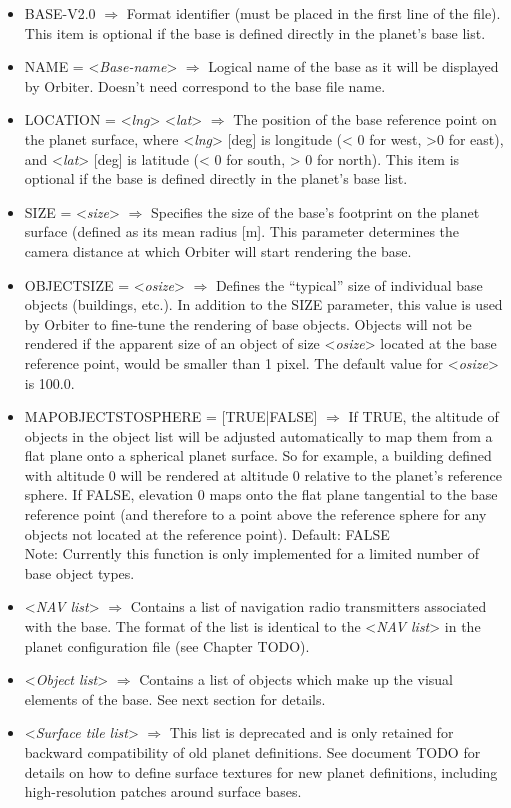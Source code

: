 \documentclass[Orbiter Developer Manual.tex]{subfiles}
\begin{document}
\begin{itemize}
\item BASE-V2.0 $\Rightarrow$ Format identifier (must be placed in the first line of the file). This item is optional if the base is defined directly in the planet’s base list.
\item NAME = <\textit{Base-name}> $\Rightarrow$ Logical name of the base as it will be displayed by Orbiter. Doesn’t need correspond to the base file name.
\item LOCATION = <\textit{lng}> <\textit{lat}> $\Rightarrow$ The position of the base reference point on the planet surface, where <\textit{lng}> [deg] is longitude (< 0 for west, >0 for east), and <\textit{lat}> [deg] is latitude (< 0 for south, > 0 for north). This item is optional if the base is defined directly in the planet’s base list.
\item SIZE = <\textit{size}> $\Rightarrow$ Specifies the size of the base’s footprint on the planet surface (defined as its mean radius [m]. This parameter determines the camera distance at which Orbiter will start rendering the base.
\item OBJECTSIZE = <\textit{osize}> $\Rightarrow$ Defines the “typical” size of individual base objects (buildings, etc.). In addition to the SIZE parameter, this value is used by Orbiter to fine-tune the rendering of base objects. Objects will not be rendered if the apparent size of an object of size <\textit{osize}> located at the base reference point, would be smaller than 1 pixel. The default value for <\textit{osize}> is 100.0.
\item MAPOBJECTSTOSPHERE = [TRUE|FALSE] $\Rightarrow$ If TRUE, the altitude of objects in the object list will be adjusted automatically to map them from a flat plane onto a spherical planet surface. So for example, a building defined with altitude 0 will be rendered at altitude 0 relative to the planet’s reference sphere. If FALSE, elevation 0 maps onto the flat plane tangential to the base reference point (and therefore to a point above the reference sphere for any objects not located at the reference point). Default: FALSE\\
Note: Currently this function is only implemented for a limited number of base object types.
\item <\textit{NAV list}> $\Rightarrow$ Contains a list of navigation radio transmitters associated with the base. The format of the list is identical to the <\textit{NAV list}> in the planet configuration file (see Chapter TODO).
\item <\textit{Object list}> $\Rightarrow$ Contains a list of objects which make up the visual elements of the base. See next section for details.
\item <\textit{Surface tile list}> $\Rightarrow$ This list is deprecated and is only retained for backward compatibility of old planet definitions. See document TODO for details on how to define surface textures for new planet definitions, including high-resolution patches around surface bases.
\end{itemize}
\end{document}
